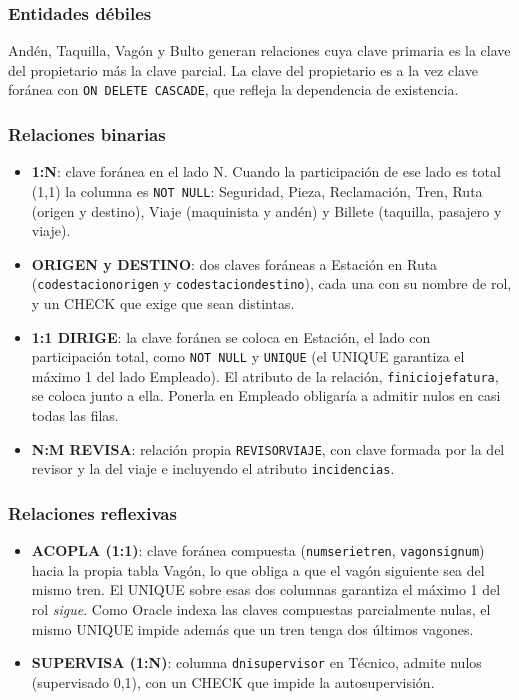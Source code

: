 \documentclass[11pt,a4paper]{article}
\DeclareRobustCommand{\_}{\textunderscore\allowbreak}
\newcommand{\tb}[1]{\texttt{#1}}
\begin{document}
\subsubsection*{Entidades débiles}
Andén, Taquilla, Vagón y Bulto generan relaciones cuya clave primaria es la clave del propietario más la clave parcial. La clave del propietario es a la vez clave foránea con \tb{ON DELETE CASCADE}, que refleja la dependencia de existencia.

\subsubsection*{Relaciones binarias}
\begin{itemize}
\item \textbf{1:N}: clave foránea en el lado N. Cuando la participación de ese lado es total (1,1) la columna es \tb{NOT NULL}: Seguridad, Pieza, Reclamación, Tren, Ruta (origen y destino), Viaje (maquinista y andén) y Billete (taquilla, pasajero y viaje).
\item \textbf{ORIGEN y DESTINO}: dos claves foráneas a Estación en Ruta (\tb{cod\_estacion\_origen} y \tb{cod\_estacion\_destino}), cada una con su nombre de rol, y un CHECK que exige que sean distintas.
\item \textbf{1:1 DIRIGE}: la clave foránea se coloca en Estación, el lado con participación total, como \tb{NOT NULL} y \tb{UNIQUE} (el UNIQUE garantiza el máximo 1 del lado Empleado). El atributo de la relación, \tb{f\_inicio\_jefatura}, se coloca junto a ella. Ponerla en Empleado obligaría a admitir nulos en casi todas las filas.
\item \textbf{N:M REVISA}: relación propia \tb{REVISOR\_VIAJE}, con clave formada por la del revisor y la del viaje e incluyendo el atributo \tb{incidencias}.
\end{itemize}

\subsubsection*{Relaciones reflexivas}
\begin{itemize}
\item \textbf{ACOPLA (1:1)}: clave foránea compuesta (\tb{num\_serie\_tren}, \tb{vagon\_sig\_num}) hacia la propia tabla Vagón, lo que obliga a que el vagón siguiente sea del mismo tren. El UNIQUE sobre esas dos columnas garantiza el máximo 1 del rol \emph{sigue}. Como Oracle indexa las claves compuestas parcialmente nulas, el mismo UNIQUE impide además que un tren tenga dos últimos vagones.
\item \textbf{SUPERVISA (1:N)}: columna \tb{dni\_supervisor} en Técnico, admite nulos (supervisado 0,1), con un CHECK que impide la autosupervisión.
\end{itemize}
\end{document}
